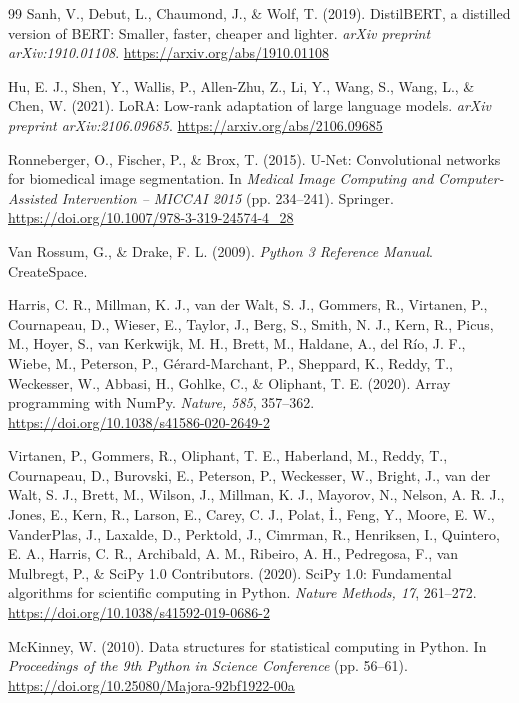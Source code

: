 \documentclass{article}
\begin{document}
\begin{normalsize}
\begin{thebibliography}{99}
Sanh, V., Debut, L., Chaumond, J., \& Wolf, T. (2019). DistilBERT, a distilled version of BERT: Smaller, faster, cheaper and lighter. \textit{arXiv preprint arXiv:1910.01108}. 
\url{https://arxiv.org/abs/1910.01108}

Hu, E. J., Shen, Y., Wallis, P., Allen-Zhu, Z., Li, Y., Wang, S., Wang, L., \& Chen, W. (2021). LoRA: Low-rank adaptation of large language models. \textit{arXiv preprint arXiv:2106.09685}. 
\url{https://arxiv.org/abs/2106.09685}

Ronneberger, O., Fischer, P., \& Brox, T. (2015). U-Net: Convolutional networks for biomedical image segmentation. In \textit{Medical Image Computing and Computer-Assisted Intervention -- MICCAI 2015} (pp. 234--241). Springer. 
\url{https://doi.org/10.1007/978-3-319-24574-4_28}

Van Rossum, G., \& Drake, F. L. (2009). \textit{Python 3 Reference Manual}. CreateSpace.

Harris, C. R., Millman, K. J., van der Walt, S. J., Gommers, R., Virtanen, P., Cournapeau, D., Wieser, E., Taylor, J., Berg, S., Smith, N. J., Kern, R., Picus, M., Hoyer, S., van Kerkwijk, M. H., Brett, M., Haldane, A., del R\'io, J. F., Wiebe, M., Peterson, P., G\'erard-Marchant, P., Sheppard, K., Reddy, T., Weckesser, W., Abbasi, H., Gohlke, C., \& Oliphant, T. E. (2020). Array programming with NumPy. \textit{Nature, 585}, 357--362. 
\url{https://doi.org/10.1038/s41586-020-2649-2}

Virtanen, P., Gommers, R., Oliphant, T. E., Haberland, M., Reddy, T., Cournapeau, D., Burovski, E., Peterson, P., Weckesser, W., Bright, J., van der Walt, S. J., Brett, M., Wilson, J., Millman, K. J., Mayorov, N., Nelson, A. R. J., Jones, E., Kern, R., Larson, E., Carey, C. J., Polat, \.I., Feng, Y., Moore, E. W., VanderPlas, J., Laxalde, D., Perktold, J., Cimrman, R., Henriksen, I., Quintero, E. A., Harris, C. R., Archibald, A. M., Ribeiro, A. H., Pedregosa, F., van Mulbregt, P., \& SciPy 1.0 Contributors. (2020). SciPy 1.0: Fundamental algorithms for scientific computing in Python. \textit{Nature Methods, 17}, 261--272. 
\url{https://doi.org/10.1038/s41592-019-0686-2}

McKinney, W. (2010). Data structures for statistical computing in Python. In \textit{Proceedings of the 9th Python in Science Conference} (pp. 56--61). 
\url{https://doi.org/10.25080/Majora-92bf1922-00a}


\end{thebibliography}
\end{normalsize}
\end{document}
